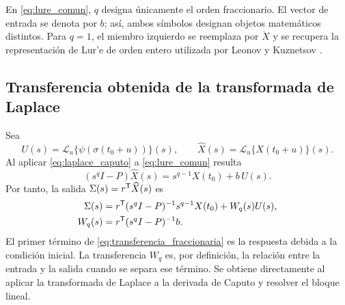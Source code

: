 En \cref{eq:lure_comun}, \(q\) designa únicamente el orden fraccionario. El
vector de entrada se denota por \(b\); así, ambos símbolos designan objetos
matemáticos distintos. Para \(q=1\), el miembro izquierdo se reemplaza por
\(\dot X\) y se recupera la representación de Lur'e de orden entero utilizada
por Leonov y Kuznetsov
\cite{LeonovKuznetsov2013,KuznetsovEtAl2017}.

\subsection{Transferencia obtenida de la transformada de Laplace}

Sea
\[
U(s)=\mathcal L_u\{\psi(\sigma(t_0+u))\}(s),\qquad
\widehat X(s)=\mathcal L_u\{X(t_0+u)\}(s).
\]
Al aplicar \cref{eq:laplace_caputo} a \cref{eq:lure_comun} resulta
\begin{equation}
(s^qI-P)\widehat X(s)
=s^{q-1}X(t_0)+b\,U(s).
\label{eq:lure_laplace}
\end{equation}
Por tanto, la salida \(\Sigma(s)=r^{\mathsf T}\widehat X(s)\) es
\begin{equation}
\begin{aligned}
\Sigma(s)
&=r^{\mathsf T}(s^qI-P)^{-1}s^{q-1}X(t_0)
  +W_q(s)U(s),\\
W_q(s)&=r^{\mathsf T}(s^qI-P)^{-1}b.
\end{aligned}
\label{eq:transferencia_fraccionaria}
\end{equation}
El primer término de \cref{eq:transferencia_fraccionaria} es la respuesta
debida a la condición inicial. La transferencia \(W_q\) es, por definición, la
relación entre la entrada y la salida cuando se separa ese término. Se obtiene
directamente al aplicar la transformada de Laplace a la derivada de Caputo y
resolver el bloque lineal.

